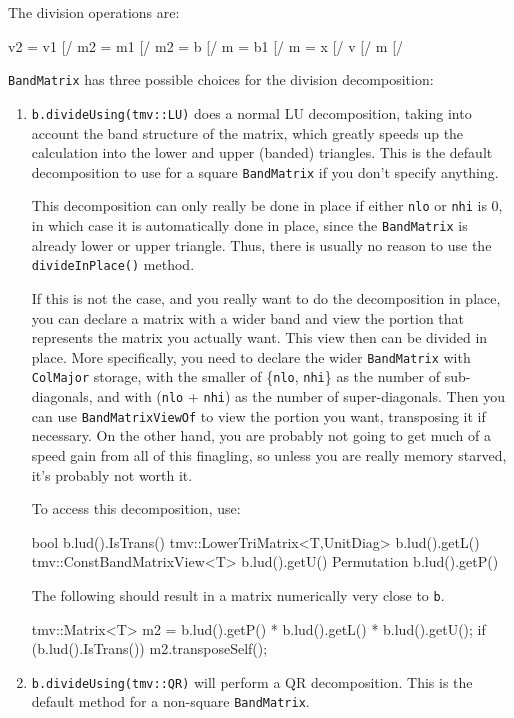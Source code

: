 \documentclass[twoside,letterpaper,11pt]{article}
\renewcommand{\tt}[1]{{\lstinline {#1}}}
\begin{document}
The division operations are:
\begin{tmvcode}
v2 = v1 [/%
m2 = m1 [/%
m2 = b [/%
m = b1 [/%
m = x [/%
v [/%
m [/%
\end{tmvcode}
\tt{BandMatrix} has three possible choices for the division decomposition:
\begin{enumerate}
\item
\tt{b.divideUsing(tmv::LU)} does a normal LU decomposition,
taking into account the band structure of the matrix, which greatly speeds up 
the calculation into the lower and upper (banded) triangles.
This is the default decomposition to use for a square \tt{BandMatrix} 
if you don't specify anything.

This decomposition can only really
be done in place if either \tt{nlo} or \tt{nhi} is 0,
in which case it is automatically done in place,
since the \tt{BandMatrix} is already lower or upper triangle.
Thus, there is usually no reason to use the \tt{divideInPlace()} method.

If this is not the case, and you really want to do the decomposition in place, you can
declare a matrix with a wider band and view the portion that represents the matrix
you actually want.  This view then can be divided in place.  More specifically,
you need to declare the wider \tt{BandMatrix} with \tt{ColMajor} storage,
with the smaller of
\{\tt{nlo}, \tt{nhi}\} as the number of sub-diagonals, and with 
(\tt{nlo} + \tt{nhi}) as the number of super-diagonals.  
Then you can use \tt{BandMatrixViewOf} to view the portion you want, transposing it if
necessary.  On the other hand, you are probably not going to get much of a speed gain 
from all of this finagling, so unless you are really memory starved, it's probably not worth it.

To access this decomposition, use:
\begin{tmvcode}
bool b.lud().IsTrans()
tmv::LowerTriMatrix<T,UnitDiag> b.lud().getL()
tmv::ConstBandMatrixView<T> b.lud().getU()
Permutation b.lud().getP()
\end{tmvcode}
The following should result in a matrix numerically very close to \tt{b}.
\begin{tmvcode}
tmv::Matrix<T> m2 = b.lud().getP() * b.lud().getL() * b.lud().getU();
if (b.lud().IsTrans()) m2.transposeSelf();
\end{tmvcode}

\item
\tt{b.divideUsing(tmv::QR)} will perform a QR decomposition.  
This is the default method for a non-square \tt{BandMatrix}.


\end{enumerate}
\end{document}
